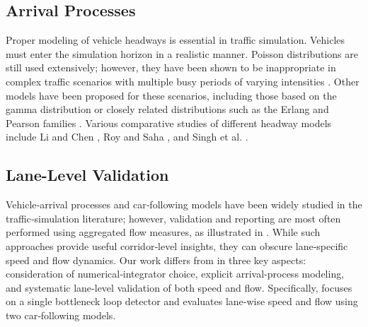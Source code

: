 \documentclass{scspaperproc}
\theoremstyle{scsthe}
\begin{document}
\subsection{Arrival Processes}
Proper modeling of vehicle headways is essential in traffic simulation. Vehicles must enter the simulation horizon 
in a realistic manner. Poisson distributions are still used extensively; however, they have been shown to be inappropriate in complex traffic scenarios with multiple busy periods of varying intensities \cite{meng2009self}. 
Other models have been proposed for these scenarios, including those based on the gamma distribution or closely 
related distributions such as the Erlang and Pearson families \cite{li2017vehicle}. Various comparative studies of 
different headway models include Li and Chen \cite{li2017vehicle}, Roy and Saha \cite{roy2018headway}, and Singh et 
al. \cite{singh2020multivariate}.

\subsection{Lane-Level Validation}
Vehicle‑arrival processes and car‑following models have been widely studied in the 
traffic‑simulation literature; however, validation and reporting are most often performed using aggregated flow 
measures, as illustrated in \cite{11118854}. While such approaches provide useful corridor‑level insights, they can obscure lane‑specific speed and flow dynamics. Our work differs from \cite{11118854} in three key aspects: consideration of numerical‑integrator choice, explicit arrival‑process modeling, and systematic lane‑level validation of both speed and flow. Specifically, \cite{11118854} focuses on a single bottleneck loop detector and evaluates lane‑wise speed and flow using two car‑following models.
\end{document}
